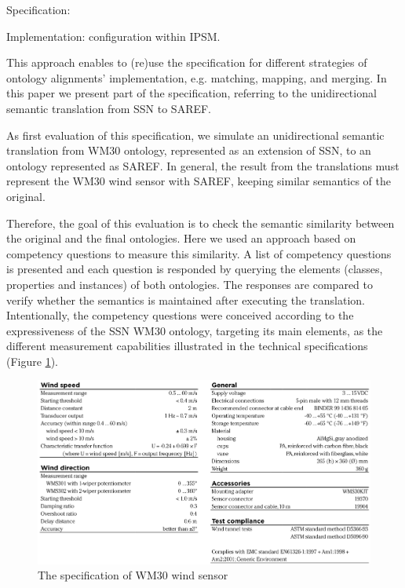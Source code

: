 \documentclass{sig-alternate-05-2015}
\begin{document}
Specification: 

Implementation: configuration within IPSM.

This approach enables to (re)use the specification for different strategies of ontology alignments’ implementation, e.g. matching, mapping, and merging. In this paper we present part of the specification, referring to the unidirectional semantic translation from SSN to SAREF.

As first evaluation of this specification, we simulate an unidirectional semantic translation from WM30 ontology, represented as an extension of SSN, to an ontology represented as SAREF. In general, the result from the translations must represent the WM30 wind sensor with SAREF, keeping similar semantics of the original. 

Therefore, the goal of this evaluation is to check the semantic similarity between the original and the final ontologies. Here we used an approach based on competency questions to measure this similarity. A list of competency questions is presented and each question is responded by querying the elements (classes, properties and instances) of both ontologies. The responses are compared to verify whether the semantics is maintained after executing the translation. Intentionally, the competency questions were conceived according to the expressiveness of the SSN WM30 ontology, targeting its main elements, as the different measurement capabilities illustrated in the technical specifications (Figure \ref{fig:WM30specifications}).

\begin{figure}[h!]
\centering
\includegraphics[scale=0.22]{WM30specifications}
\caption{The specification of WM30 wind sensor}
\label{fig:WM30specifications}
\end{figure}
\end{document}
